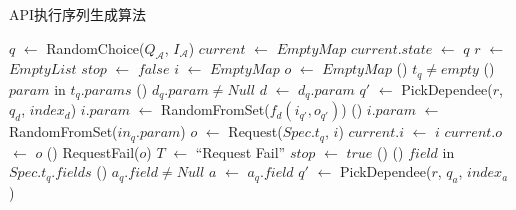         \begin{algorithm}
          	\scriptsize
          	
            \caption{API执行序列生成算法}
          	
            $q$ $\gets$ RandomChoice($Q_{\mathcal{A}}$, $I_{\mathcal{A}}$)\;
            $current$ $\gets$ $EmptyMap$\;
            $current.state$ $\gets$ $q$\;
            $r$ $\gets$ $EmptyList$\;
            $stop$ $\gets$ $false$\;
             {
            	$i$ $\gets$ $EmptyMap$\;
                $o$ $\gets$ $EmptyMap$\;
            	\If() {$t_q \neq empty$}{
                	\ForEach() {$param$ in $t_q.params$} {
                    	\If() {$d_q.param \neq Null$} {
                        	$d$ $\gets$ $d_q.param$\;
                            $q'$ $\gets$ PickDependee($r$, $q_d$, $index_d$)\;
                            $i.param$ $\gets$ RandomFromSet($f_d(i_{q'}, o_{q'})$)\;
                        } \Else() {
                        	$i.param$ $\gets$ RandomFromSet($in_q.param$)\;
                        }
                    }
                    $o$ $\gets$ Request($Spec.t_q$, $i$)\;
                    $current.i$ $\gets$ $i$\;
                    $current.o$ $\gets$ $o$\;
                    \If() {RequestFail($o$)} {
                    	$T$ $\gets$ ``Request Fail''\;
                        $stop$ $\gets$ $true$\;
                    } \Else() {
                    	\ForEach() {$field$ in $Spec.t_q.fields$} {
                        	\If() {$a_q.field \neq Null$} {
                            	$a$ $\gets$ $a_q.field$\;
                                $q'$ $\gets$ PickDependee($r$, $q_a$, $index_a$)\;
}}}}}
\end{algorithm}
